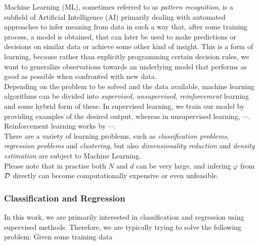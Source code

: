 Machine Learning (ML), sometimes referred to as \emph{pattern recognition}, is a subfield of Artificial Intelligence (AI) primarily dealing with automated approaches to infer meaning from data in such a way that, after some training process, a model is obtained, that can later be used to make predictions or decisions on similar data or achieve some other kind of insight. This is a form of learning, because rather than explicitly programming certain decision rules, we want to generalize observations towards an underlying model that performs as good as possible when confronted with new data.\\

Depending on the problem to be solved and the data available, machine learning algorithms can be divided into \emph{supervised}, \emph{unsupervised}, \emph{reinforcement} learning and some hybrid form of these. In supervised learning, we train our model by providing examples of the desired output, whereas in unsupervised learning, $\cdots$. \todo{} Reinforcement learning works by $\cdots$.\\

There are a variety of learning problems, such as \emph{classification problems}, \emph{regression problems} and \emph{clustering}, but also \emph{dimensionality reduction} and \emph{density estimation} are subject to Machine Learning.\\


Please note that in practise both $N$ and $d$ can be very large, and infering $\varphi$ from $\mathcal{D}$ directly can become computationally expensive or even unfeasible.

\subsubsection{Classification and Regression}

In this work, we are primarily interested in classification and regression using supervised methods. Therefore, we are typically trying to solve the following problem: Given some training data


